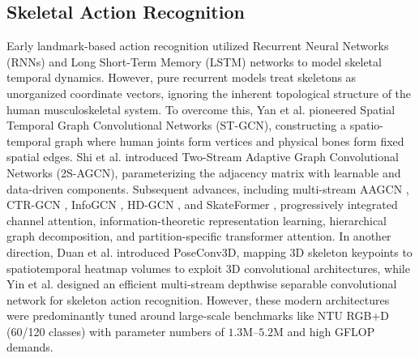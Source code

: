 \documentclass[preprint,12pt]{elsarticle}
\begin{document}
\subsection{Skeletal Action Recognition}
Early landmark-based action recognition utilized Recurrent Neural Networks (RNNs) and Long Short-Term Memory (LSTM) networks \cite{hochreiter1997long,graves2005,li2017} to model skeletal temporal dynamics. 
However, pure recurrent models treat skeletons as unorganized coordinate vectors, ignoring the inherent topological structure of the human musculoskeletal system.
To overcome this, Yan et al. \cite{yan2018} pioneered Spatial Temporal Graph Convolutional Networks (ST-GCN), constructing a spatio-temporal graph where human joints form vertices and physical bones form fixed spatial edges. 
Shi et al. \cite{shi2019two} introduced Two-Stream Adaptive Graph Convolutional Networks (2S-AGCN), parameterizing the adjacency matrix with learnable and data-driven components. 
Subsequent advances, including multi-stream AAGCN \cite{shi2020skeleton}, CTR-GCN \cite{chen2021channel}, InfoGCN \cite{chi2022infogcn}, HD-GCN \cite{lee2023hdgcn}, and SkateFormer \cite{zheng2024skateformer}, progressively integrated channel attention, information-theoretic representation learning, hierarchical graph decomposition, and partition-specific transformer attention. 
In another direction, Duan et al. \cite{duan2022} introduced PoseConv3D, mapping 3D skeleton keypoints to spatiotemporal heatmap volumes to exploit 3D convolutional architectures, while Yin et al. \cite{yin2023} designed an efficient multi-stream depthwise separable convolutional network for skeleton action recognition. 
However, these modern architectures were predominantly tuned around large-scale benchmarks like NTU RGB+D (60/120 classes) with parameter numbers of $1.3\text{M}$--$5.2\text{M}$ and high GFLOP demands. 
\end{document}
